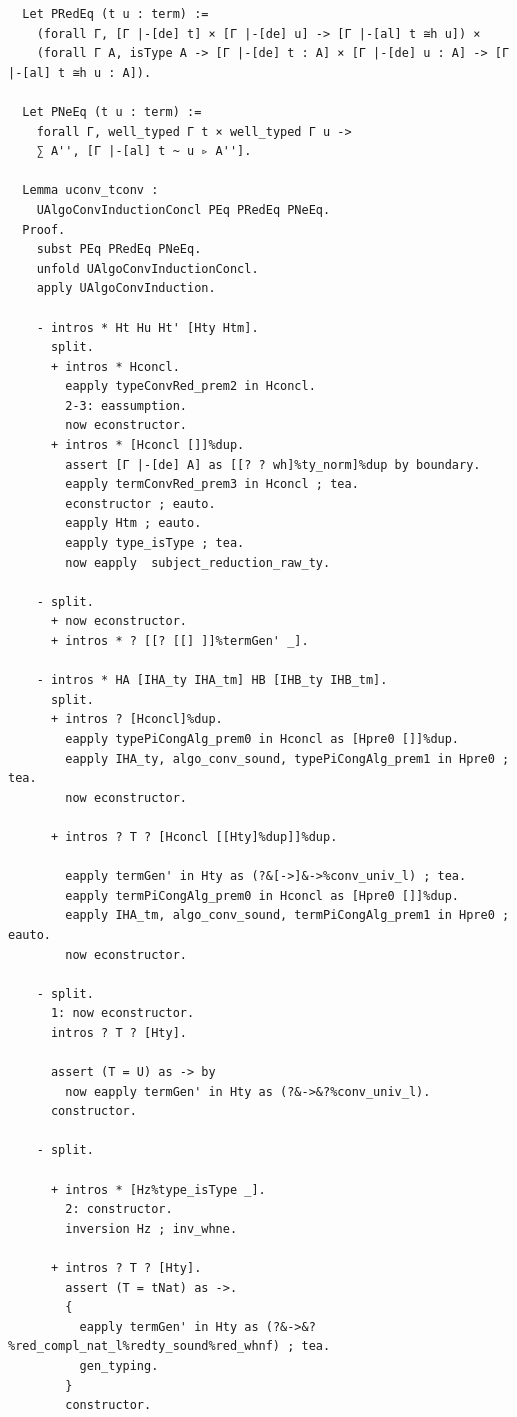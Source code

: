 \begin{lstlisting}
  Let PRedEq (t u : term) :=
    (forall Γ, [Γ |-[de] t] × [Γ |-[de] u] -> [Γ |-[al] t ≅h u]) ×
    (forall Γ A, isType A -> [Γ |-[de] t : A] × [Γ |-[de] u : A] -> [Γ |-[al] t ≅h u : A]).

  Let PNeEq (t u : term) :=
    forall Γ, well_typed Γ t × well_typed Γ u ->
    ∑ A'', [Γ |-[al] t ~ u ▹ A''].

  Lemma uconv_tconv :
    UAlgoConvInductionConcl PEq PRedEq PNeEq.
  Proof.
    subst PEq PRedEq PNeEq.
    unfold UAlgoConvInductionConcl.
    apply UAlgoConvInduction.
    
    - intros * Ht Hu Ht' [Hty Htm].
      split.
      + intros * Hconcl.
        eapply typeConvRed_prem2 in Hconcl.
        2-3: eassumption.
        now econstructor.
      + intros * [Hconcl []]%dup.
        assert [Γ |-[de] A] as [[? ? wh]%ty_norm]%dup by boundary.
        eapply termConvRed_prem3 in Hconcl ; tea.
        econstructor ; eauto.
        eapply Htm ; eauto.
        eapply type_isType ; tea.
        now eapply  subject_reduction_raw_ty.

    - split.
      + now econstructor.
      + intros * ? [[? [[] ]]%termGen' _].

    - intros * HA [IHA_ty IHA_tm] HB [IHB_ty IHB_tm].
      split.
      + intros ? [Hconcl]%dup.
        eapply typePiCongAlg_prem0 in Hconcl as [Hpre0 []]%dup.
        eapply IHA_ty, algo_conv_sound, typePiCongAlg_prem1 in Hpre0 ; tea.
        now econstructor.

      + intros ? T ? [Hconcl [[Hty]%dup]]%dup.

        eapply termGen' in Hty as (?&[->]&->%conv_univ_l) ; tea.
        eapply termPiCongAlg_prem0 in Hconcl as [Hpre0 []]%dup.
        eapply IHA_tm, algo_conv_sound, termPiCongAlg_prem1 in Hpre0 ; eauto.
        now econstructor.
        
    - split.
      1: now econstructor.
      intros ? T ? [Hty].

      assert (T = U) as -> by
        now eapply termGen' in Hty as (?&->&?%conv_univ_l).
      constructor.

    - split.
      
      + intros * [Hz%type_isType _].
        2: constructor.
        inversion Hz ; inv_whne.

      + intros ? T ? [Hty].
        assert (T = tNat) as ->.
        {
          eapply termGen' in Hty as (?&->&?%red_compl_nat_l%redty_sound%red_whnf) ; tea.
          gen_typing.
        }
        constructor.


\end{lstlisting}
